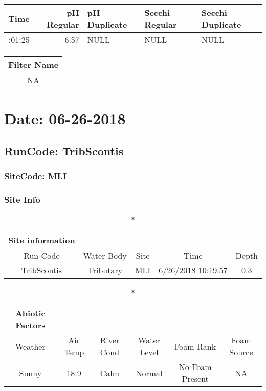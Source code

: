 \documentclass[
  letterpaper,
  DIV=11,
  numbers=noendperiod]{scrartcl}
\begin{document}
\begin{longtable*}{rrlll}
\toprule
Time & pH Regular & pH Duplicate & Secchi Regular & Secchi Duplicate \\ 
\midrule{}:01:25 & 6.57 & NULL & NULL & NULL \\ 
\bottomrule
\end{longtable*}

\begin{longtable*}{c}
\toprule
Filter Name \\ 
\midrule\addlinespace[2.5pt]
NA \\ 
\bottomrule
\end{longtable*}

\hypertarget{date-06-26-2018}{%
\section{Date: 06-26-2018}\label{date-06-26-2018}}

\hypertarget{runcode-tribscontis}{%
\subsection{RunCode: TribScontis}\label{runcode-tribscontis}}

\hypertarget{sitecode-mli}{%
\subsubsection{SiteCode: MLI}\label{sitecode-mli}}

\subsubsection{Site Info}

\begin{longtable*}{ccccc}
\caption*{
{\large Site information}
} \\ 
\toprule
Run Code & Water Body & Site & Time & Depth \\ 
\midrule\addlinespace[2.5pt]
TribScontis & Tributary & MLI & 6/26/2018 10:19:57 & 0.3 \\ 
\bottomrule
\end{longtable*}

\begin{longtable*}{cccccc}
\caption*{
{\large Abiotic Factors}
} \\ 
\toprule
Weather & Air Temp & River Cond & Water Level & Foam Rank & Foam Source \\ 
\midrule\addlinespace[2.5pt]
Sunny & 18.9 & Calm & Normal & No Foam Present & NA \\ 
\bottomrule
\end{longtable*}
\end{document}
